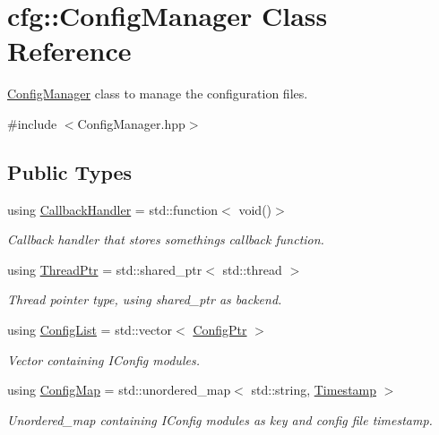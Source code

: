 \hypertarget{classcfg_1_1_config_manager}{}\section{cfg\+:\+:Config\+Manager Class Reference}
\label{classcfg_1_1_config_manager}


\hyperlink{classcfg_1_1_config_manager}{Config\+Manager} class to manage the configuration files.  




{\ttfamily \#include $<$Config\+Manager.\+hpp$>$}

\subsection*{Public Types}
\begin{DoxyCompactItemize}
\item 
using \hyperlink{classcfg_1_1_config_manager_a6614f22d32db38ce6d6ed5b351d4f628}{Callback\+Handler} = std\+::function$<$ void()$>$
\begin{DoxyCompactList}\small\item\em Callback handler that stores something\textquotesingle{}s callback function. \end{DoxyCompactList}\item 
using \hyperlink{classcfg_1_1_config_manager_abb7d9a63860843839fa4d8f339f0122b}{Thread\+Ptr} = std\+::shared\+\_\+ptr$<$ std\+::thread $>$
\begin{DoxyCompactList}\small\item\em Thread pointer type, using shared\+\_\+ptr as backend. \end{DoxyCompactList}\item 
using \hyperlink{classcfg_1_1_config_manager_a94ed7fb2c98c2584e0f98326bf65c98f}{Config\+List} = std\+::vector$<$ \hyperlink{namespacecfg_af5f3a3fc2010c76e90bc66696485989f}{Config\+Ptr} $>$
\begin{DoxyCompactList}\small\item\em Vector containing I\+Config modules. \end{DoxyCompactList}\item 
using \hyperlink{classcfg_1_1_config_manager_ac50f6c213e2646aa1c261c431b6fe351}{Config\+Map} = std\+::unordered\+\_\+map$<$ std\+::string, \hyperlink{namespacecfg_aa17d58439174a5af7fb3f37a3cdd6d0b}{Timestamp} $>$
\begin{DoxyCompactList}\small\item\em Unordered\+\_\+map containing I\+Config modules as key and config file timestamp. \end{DoxyCompactList}\end{DoxyCompactItemize}
